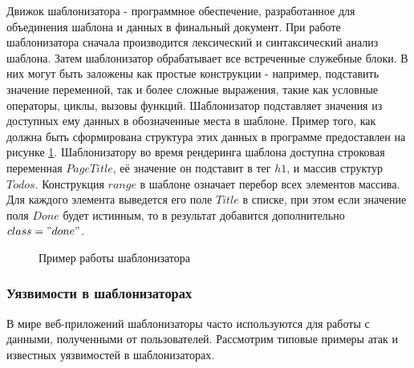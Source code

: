 \documentclass[a4paper]{article}
\begin{document}
Движок шаблонизатора - программное обеспечение, разработанное для объединения шаблона и данных в финальный документ. При работе шаблонизатора сначала производится лексический и синтаксический анализ шаблона. Затем шаблонизатор обрабатывает все встреченные служебные блоки. В них могут быть заложены как простые конструкции - например, подставить значение переменной, так и более сложные выражения, такие как условные операторы, циклы, вызовы функций. Шаблонизатор подставляет значения из доступных ему данных в обозначенные места в шаблоне. Пример того, как должна быть сформирована структура этих данных в программе предоставлен на рисунке \ref{GolangWorkExample}. Шаблонизатору во время рендеринга шаблона доступна строковая переменная $PageTitle$, её значение он подставит в тег $h1$, и массив структур $Todos$. Конструкция $range$ в шаблоне означает перебор всех элементов массива. Для каждого элемента выведется его поле $Title$ в списке, при этом если значение поля $Done$ будет истинным, то в результат добавится дополнительно $class="done"$.

\begin{figure}[!tbp]
\centering
{}
\hfill
{}
\caption{Пример работы шаблонизатора}
\label{GolangWorkExample}
\end{figure}

\subsubsection{Уязвимости в шаблонизаторах}
\indent

В мире веб-приложений шаблонизаторы часто используются для работы с данными, полученными от пользователей. Рассмотрим типовые примеры атак и известных уязвимостей в шаблонизаторах.
\end{document}
